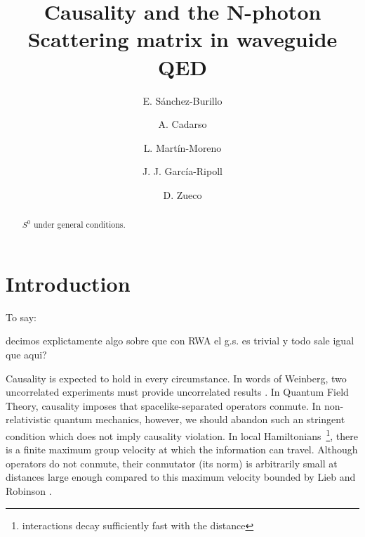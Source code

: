 \documentclass[notitlepage, prx, preprint, amsmath,superscriptaddress,amssymb]{revtex4-1}
\begin{document}
\title{Causality and the N-photon Scattering matrix in waveguide QED}

\author{E. S\'anchez-Burillo}

\author{A. Cadarso}

\author{L. Mart\'in-Moreno}

\author{J. J. Garc\'ia-Ripoll}

\author{D. Zueco}



\begin{abstract}
$S^0$ under general conditions.

\end{abstract}



\maketitle

\section{Introduction}

{\color{red}
To say:

decimos explictamente algo sobre que con RWA el g.s. es trivial y todo sale igual que aqui?
}


Causality is  expected to hold in every circumstance.    In words of Weinberg, two uncorrelated experiments must provide uncorrelated results \cite{Weinberg1996}.     In Quantum Field Theory, causality imposes that  spacelike-separated operators conmute.   In non-relativistic quantum mechanics, however, we should abandon such an stringent condition which  does not imply causality violation.  In local Hamiltonians~\footnote{interactions decay sufficiently fast with the distance}, there is a finite maximum  group velocity at which the information can travel.   Although operators do not conmute,  their conmutator  (its norm) is arbitrarily small at distances large enough compared to this maximum velocity  bounded by Lieb and Robinson \cite{Lieb1972}.  
\end{document}
